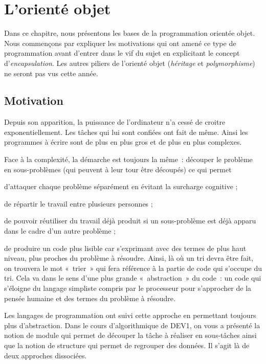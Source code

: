 \chapter{L'orienté objet}

	Dans ce chapitre, nous présentons les bases de la programmation orientée
	objet. Nous commençons par expliquer les motivations qui ont amené ce
	type de programmation avant d'entrer dans le vif du
	sujet en explicitant le concept
	d'\textit{encapsulation}. Les autres piliers de
	l'orienté objet (\textit{héritage} et
	\textit{polymorphisme}) ne seront pas vus cette année.

\section{Motivation}

	Depuis son apparition, la puissance de l'ordinateur
	n'a cessé de croitre exponentiellement. Les tâches qui
	lui sont confiées ont fait de même. Ainsi les programmes à écrire sont
	de plus en plus gros et de plus en plus complexes.
	
	Face à la complexité, la démarche est toujours la même~: découper le
	problème en sous-problèmes (qui peuvent à leur tour être découpés) ce
	qui permet

	\begin{liste}
		\item 
			d'attaquer chaque problème séparément en évitant la
			surcharge cognitive ;
		\item 
			de répartir le travail entre plusieurs personnes ;
		\item 
			de pouvoir réutiliser du travail déjà produit si un sous-problème est
			déjà apparu dans le cadre d'un autre problème ;
		\item 
			de produire un code plus lisible car s'exprimant avec
			des termes de plus haut niveau, 
			plus proches du problème à résoudre.
			Ainsi, là où un tri devra être fait, 
			on trouvera le mot «~trier~» qui fera référence 
			à la partie de code qui s’occupe du tri. 
			Cela va dans le sens d’une plus grande «~abstraction~» du code~: 
			un code qui s’éloigne du langage simpliste 
			compris par le processeur pour s’approcher de la
			pensée humaine et des termes du problème à résoudre.
	\end{liste}
	
	Les langages de programmation ont suivi cette approche en permettant
	toujours plus d’abstraction. Dans le cours d'algorithmique de DEV1, on vous a
	présenté la notion de module qui permet de découper la tâche à réaliser
	en sous-tâches ainsi que la notion de structure qui permet de regrouper
	des données. Il s'agit là de deux approches	dissociées. 

